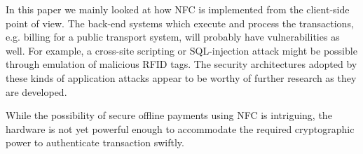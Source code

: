 In this paper we mainly looked at how NFC is implemented from the client-side point of view.
The back-end systems which execute and process the transactions, e.g. billing for a public transport system, will probably have vulnerabilities as well.
For example, a cross-site scripting or SQL-injection attack might be possible through emulation of malicious RFID tags.\cite{rieback2006your}
The security architectures adopted by these kinds of application attacks appear to be worthy of further research as they are developed.

While the possibility of secure offline payments using NFC is intriguing, the hardware is not yet powerful enough to accommodate the required cryptographic power to authenticate transaction swiftly.
